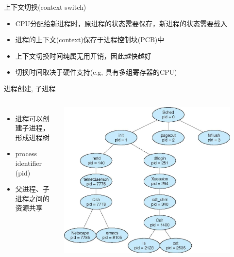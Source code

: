 \documentclass[xcolor=svgnames]{beamer}
\begin{document}
\begin{CJK*}{UTF8}{gbsn}
\begin{frame}{上下文切换(context switch)}
\begin{itemize}
\item CPU分配给新进程时，原进程的状态需要保存，新进程的状态需要载入
\item 进程的上下文(context)保存于进程控制块(PCB)中
\item 上下文切换时间纯属无用开销，因此越快越好
\item 切换时间取决于硬件支持(e.g, 具有多组寄存器的CPU)
\end{itemize}
\end{frame}




\begin{frame}{进程创建, 子进程}
\begin{columns}%
\begin{itemize}
\item 进程可以创建子进程，形成进程树
\item process identifier (pid)
\item 父进程、子进程之间的资源共享
\end{itemize}
\includegraphics[width=0.9\textwidth]{tree.jpg}
\end{columns}%
\end{frame}


\end{CJK*}
\end{document}
